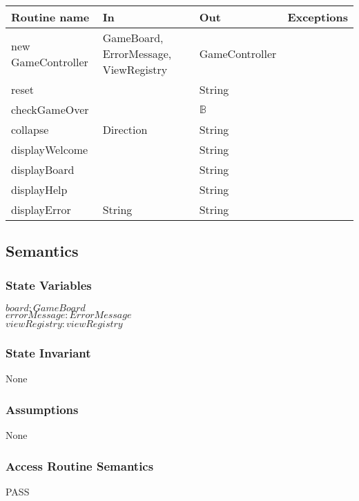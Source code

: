 \documentclass[12pt]{article}
\begin{document}
\begin{tabular}{| l | l | l | p{5cm} |}
\hline
\textbf{Routine name} & \textbf{In} & \textbf{Out} & \textbf{Exceptions}\\
\hline
new GameController & GameBoard, ErrorMessage, ViewRegistry & GameController & \\
\hline
reset & & String & ~\\
\hline
checkGameOver &  & $\mathbb{B}$ & ~\\
\hline
collapse & Direction & String & ~\\
\hline
displayWelcome & & String &\\
\hline
displayBoard & & String & ~\\
\hline
displayHelp & & String & ~\\
\hline
displayError & String& String & ~\\
\hline
\end{tabular}

\subsection* {Semantics}

\subsubsection* {State Variables}

$board: GameBoard$\\
$errorMessage: ErrorMessage$\\
$viewRegistry: viewRegistry$\\

\subsubsection* {State Invariant}

None

\subsubsection* {Assumptions}

None

\subsubsection* {Access Routine Semantics}

PASS

\newpage
\end{document}
